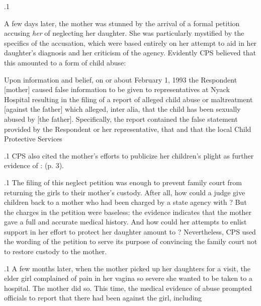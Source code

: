 \documentclass[11pt, twoside]{article}
\begin{document}
{\p.1{%
A few days later, the mother was stunned by the arrival of a formal
petition accusing \textit{her} of neglecting her daughter. She was particularly
mystified by the specifics of the accusation, which were based entirely
on her attempt to aid in her daughter's diagnosis and her criticism of the
agency. Evidently CPS believed that this amounted to a form of child
abuse:

\begin{blockQuote}
Upon information and belief, on or about February 1, 1993 the
Respondent [mother] caused false information to be given to representatives at Nyack Hospital resulting in the filing of a report of
alleged child abuse or maltreatment [against the father] which alleged, inter alia, that the child has been sexually abused 
by [the father]. Specifically, the report contained the false statement provided by the Respondent or her representative, that  and that the local
Child Protective Services 
\end{blockQuote}

}%

\p.1{%
CPS also cited the mother's efforts to publicize her children's plight as
further evidence of :  (p. 3).
}%

\p.1{%
The filing of this neglect petition was enough to prevent family
court from returning the girls to their mother's custody. After all, how
could a judge give children back to a mother who had been charged
by a state agency with ? But the charges in the petition were
baseless: the evidence indicates that the mother gave a full and accurate medical history. And how could her attempts to enlist support
in her effort to protect her daughter amount to ? Nevertheless, CPS used the wording of the petition to serve its 
purpose of convincing the family court not to restore custody to the
mother.
}%

\p.1{%
A few months later, when the mother picked up her daughters for
a visit, the elder girl complained of pain in her vagina so severe she
wanted to be taken to a hospital. The mother did so. This time, the medical evidence of abuse prompted officials to report that there had been
 against the girl, including 
}%

}
\end{document}
